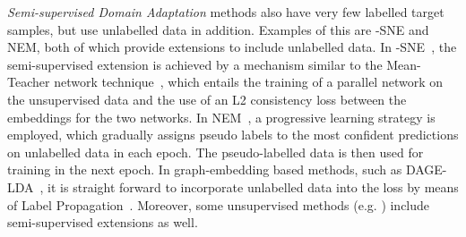 \documentclass[journal]{IEEEtran}
\begin{document}
\textit{Semi-supervised Domain Adaptation} methods also have very few labelled target samples, but use unlabelled data in addition. Examples of this are -SNE and NEM, both of which provide extensions to include unlabelled data. 
In -SNE~\cite{xu2019dsne}, the semi-supervised extension is achieved by a mechanism similar to the Mean-Teacher network technique~\cite{tarvainen2017mean}, which entails the training of a parallel network on the unsupervised data and the use of an L2 consistency loss between the embeddings for the two networks.
In NEM~\cite{wang2019nem}, a progressive learning strategy is employed, which gradually assigns pseudo labels to the most confident predictions on unlabelled data in each epoch. The pseudo-labelled data is then used for training in the next epoch.
In graph-embedding based methods, such as DAGE-LDA~\cite{hedegaard2020supervised}, it is straight forward to incorporate unlabelled data into the loss by means of Label Propagation~\cite{zhu2003semi, weston2008deep}.
Moreover, some unsupervised methods (e.g. \cite{li2019locality, chen2020domain}) include semi-supervised extensions as well.
\end{document}
